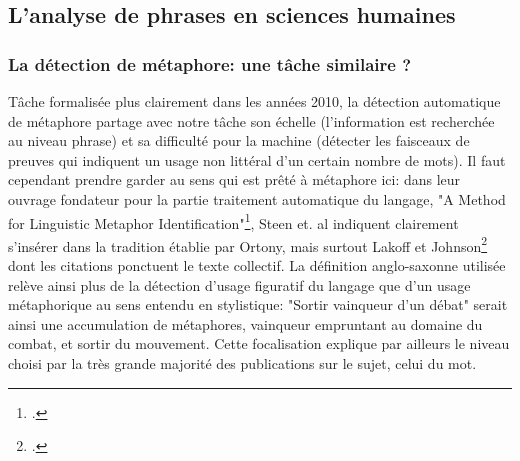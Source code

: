 \subsection{L'analyse de phrases en sciences humaines}

\subsubsection{La détection de métaphore: une tâche similaire ?}

Tâche formalisée plus clairement dans les années 2010, la détection automatique de métaphore partage avec notre tâche son échelle (l'information est recherchée au niveau phrase) et sa difficulté pour la machine (détecter les faisceaux de preuves qui indiquent un usage non littéral d'un certain nombre de mots). Il faut cependant prendre garder au sens qui est prêté à métaphore ici: dans leur ouvrage fondateur pour la partie traitement automatique du langage, "A Method for Linguistic Metaphor Identification"\footcite{steen_method_2010}, Steen et. al indiquent clairement s'insérer dans la tradition établie par Ortony, mais surtout Lakoff et Johnson\footcite{lakoff_metaphors_2003} dont les citations ponctuent le texte collectif. La définition anglo-saxonne utilisée relève ainsi plus de la détection d'usage figuratif du langage que d'un usage métaphorique au sens entendu en stylistique: "Sortir vainqueur d'un débat" serait ainsi une accumulation de métaphores, vainqueur empruntant au domaine du combat, et sortir du mouvement. Cette focalisation explique par ailleurs le niveau choisi par la très grande majorité des publications sur le sujet, celui du mot.

